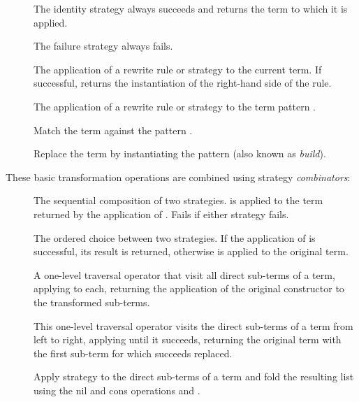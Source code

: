 \begin{description}
\item[] The identity strategy always succeeds and returns the term
to which it is applied.
\item[] The failure strategy always fails.
\item[] The application of a rewrite rule or strategy
 to the current term. If successful, returns the instantiation of
the right-hand side of the rule.
\item[] The application of a rewrite rule or strategy
 to the term pattern .
\item[] Match the term against the pattern .
\item[] Replace the term by instantiating the pattern
 (also known as \emph{build}).
\end{description}

These basic transformation operations are combined using strategy
\emph{combinators}:

\begin{description}
\item[] The sequential composition of two strategies.
 is applied to the term returned by the
application of . Fails if either strategy fails.
\item[] The ordered choice between two strategies.
If the application of  is successful, its result is returned,
otherwise  is applied to the original term.
\item[] A one-level traversal operator that visit all direct
sub-terms of a term, applying  to each, returning the application
of the original constructor to the transformed sub-terms.
\item[] This one-level traversal operator visits the direct
sub-terms of a term from left to right, applying  until it
succeeds, returning the original term with the first sub-term for which
 succeeds replaced.
\item[] Apply strategy  to the direct
sub-terms of a term and fold the resulting list using the nil and cons
operations  and .
\end{description}

